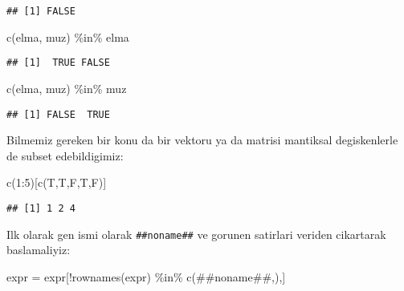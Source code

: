 \documentclass[
]{book}
\newenvironment{Shaded}{\begin{snugshade}}{\end{snugshade}}
\newcommand{\DecValTok}[1]{\textcolor[rgb]{0.00,0.00,0.81}{#1}}
\newcommand{\FunctionTok}[1]{\textcolor[rgb]{0.00,0.00,0.00}{#1}}
\newcommand{\NormalTok}[1]{#1}
\newcommand{\OtherTok}[1]{\textcolor[rgb]{0.56,0.35,0.01}{#1}}
\newcommand{\SpecialCharTok}[1]{\textcolor[rgb]{0.00,0.00,0.00}{#1}}
\newcommand{\StringTok}[1]{\textcolor[rgb]{0.31,0.60,0.02}{#1}}
\begin{document}
\begin{verbatim}
## [1] FALSE
\end{verbatim}

\begin{Shaded}
\begin{Highlighting}[]
\FunctionTok{c}\NormalTok{(}\StringTok{\textquotesingle{}elma\textquotesingle{}}\NormalTok{, }\StringTok{\textquotesingle{}muz\textquotesingle{}}\NormalTok{) }\SpecialCharTok{\%in\%} \StringTok{\textquotesingle{}elma\textquotesingle{}}
\end{Highlighting}
\end{Shaded}

\begin{verbatim}
## [1]  TRUE FALSE
\end{verbatim}

\begin{Shaded}
\begin{Highlighting}[]
\FunctionTok{c}\NormalTok{(}\StringTok{\textquotesingle{}elma\textquotesingle{}}\NormalTok{, }\StringTok{\textquotesingle{}muz\textquotesingle{}}\NormalTok{) }\SpecialCharTok{\%in\%} \StringTok{\textquotesingle{}muz\textquotesingle{}}
\end{Highlighting}
\end{Shaded}

\begin{verbatim}
## [1] FALSE  TRUE
\end{verbatim}

Bilmemiz gereken bir konu da bir vektoru ya da matrisi mantiksal degiskenlerle de subset edebildigimiz:

\begin{Shaded}
\begin{Highlighting}[]
\FunctionTok{c}\NormalTok{(}\DecValTok{1}\SpecialCharTok{:}\DecValTok{5}\NormalTok{)[}\FunctionTok{c}\NormalTok{(T,T,F,T,F)]}
\end{Highlighting}
\end{Shaded}

\begin{verbatim}
## [1] 1 2 4
\end{verbatim}

Ilk olarak gen ismi olarak \texttt{\textquotesingle{}\#\#noname\#\#} ve \texttt{\textquotesingle{}\textquotesingle{}} gorunen satirlari veriden cikartarak baslamaliyiz:

\begin{Shaded}
\begin{Highlighting}[]
\NormalTok{expr }\OtherTok{=}\NormalTok{ expr[}\SpecialCharTok{!}\FunctionTok{rownames}\NormalTok{(expr) }\SpecialCharTok{\%in\%} \FunctionTok{c}\NormalTok{(}\StringTok{\textquotesingle{}\#\#noname\#\#\textquotesingle{}}\NormalTok{,}\StringTok{\textquotesingle{}\textquotesingle{}}\NormalTok{),]}
\end{Highlighting}
\end{Shaded}
\end{document}

